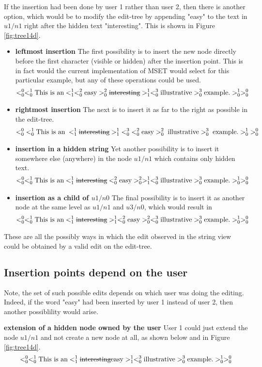 \documentclass{amsart}
\begin{document}
If the insertion had been done by user 1 rather than user 2, then there
is another option, which would be to modify the edit-tree by appending
"easy" to the text in $u1/n1$ right after the hidden text "interesting".
This is shown in Figure \ref{fig:tree14d}.
\begin{itemize}
\item {\bf leftmost insertion}
The first possibility is to insert the new node directly before the
first character (visible or hidden) after the insertion point. This
is in fact would the current implementation of MSET would select
for this particular example,
but any of these operations could be used.
\[
 <^0_0 <^1_0 
 \text{This is an} 
   <^1_1 <^2_0 \text{easy} >^2_0 \text{\sout{interesting}} >^1_1
  <^3_0 \text{illustrative} >^3_0
  \text{example.} >^1_0 >^0_0
\]
\item {\bf rightmost insertion}
The next is to insert it as far to the right as possible in
the edit-tree.
\[
 <^0_0 \;<^1_0 
 \text{This is an} 
   \;<^1_1 \text{\sout{interesting}} >^1_1\;
  <^3_0 \;<^2_0 \text{easy} >^2_0 \;\text{illustrative} >^3_0\;
  \text{example.} >^1_0\; >^0_0
\]
\item {\bf insertion in a hidden string}
Yet another possibility is to insert it somewhere else (anywhere) in the node $u1/n1$
which contains only hidden text.
\[
 <^0_0 <^1_0 
 \text{This is an} 
   <^1_1 \text{\sout{interesting}} <^2_0 \text{easy} >^2_0>^1_1
  <^3_0 \text{illustrative} >^3_0
  \text{example.} >^1_0 >^0_0
\]
\item {\bf insertion as a child of $u1/n0$}
The final possibility is to insert it as another node at the same level
as $u1/n1$ and $u3/n0$, which would result in
\[
 <^0_0 <^1_0 
 \text{This is an} 
   <^1_1 \text{\sout{interesting}}>^1_1
   <^2_0 \text{easy} >^2_0
   <^3_0 \text{illustrative} >^3_0
 \text{example.} >^1_0 >^0_0
\]
\end{itemize}
These are all the possibly ways in which the edit observed in the string view
could be obtained by a valid edit on the edit-tree.

\subsection{Insertion points depend on the user}
Note, the set of such possible edits depends on which user was doing the
editing. Indeed, 
if the word "easy" had been inserted by user 1 instead of user 2,
then another possiblility
would arise. 

{\bf extension of a hidden node owned by the user}
User 1 could just extend the node $u1/n1$
and not create a new node at all, as shown below and in Figure \ref{fig:tree14d}.
\[
 <^0_0 <^1_0 
 \text{This is an} 
   <^1_1 \text{\sout{interesting}easy}>^1_1
  <^3_0 \text{illustrative} >^3_0
  \text{example.} >^1_0 >^0_0
\]
\end{document}
